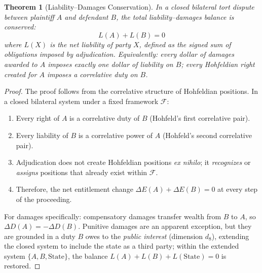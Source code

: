 \documentclass[12pt]{article}
\newtheorem{theorem}{Theorem}[section]
\theoremstyle{definition}
\theoremstyle{remark}
\begin{document}
\begin{theorem}[Liability--Damages Conservation]
\label{thm:liability_conservation}
In a closed bilateral tort dispute between plaintiff $A$ and defendant $B$, the total \emph{liability--damages balance} is conserved:
\begin{equation}
L(A) + L(B) = 0
\label{eq:liability_conservation}
\end{equation}
where $L(X)$ is the net liability of party $X$, defined as the signed sum of obligations imposed by adjudication.  Equivalently: every dollar of damages awarded to $A$ imposes exactly one dollar of liability on $B$; every Hohfeldian right created for $A$ imposes a correlative duty on $B$.
\end{theorem}

\begin{proof}
The proof follows from the correlative structure of Hohfeldian positions.  In a closed bilateral system under a fixed framework $\mathcal{F}$:
\begin{enumerate}
    \item Every right of $A$ is a correlative duty of $B$ (Hohfeld's first correlative pair).
    \item Every liability of $B$ is a correlative power of $A$ (Hohfeld's second correlative pair).
    \item Adjudication does not create Hohfeldian positions \emph{ex nihilo}; it \emph{recognizes} or \emph{assigns} positions that already exist within $\mathcal{F}$.
    \item Therefore, the net entitlement change $\Delta E(A) + \Delta E(B) = 0$ at every step of the proceeding.
\end{enumerate}
For damages specifically: compensatory damages transfer wealth from $B$ to $A$, so $\Delta D(A) = -\Delta D(B)$.  Punitive damages are an apparent exception, but they are grounded in a duty $B$ owes to the \emph{public interest} (dimension $d_8$), extending the closed system to include the state as a third party; within the extended system $\{A, B, \text{State}\}$, the balance $L(A) + L(B) + L(\text{State}) = 0$ is restored.
\end{proof}
\end{document}
